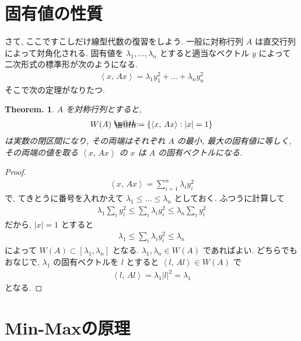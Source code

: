 \documentclass[openany, a4paper, oneside]{book}
\makeatletter
\newcommand*{\defeq}{\mathrel{\rlap{%
\raisebox{0.3ex}{$\m@th\cdot$}}%
\raisebox{-0.3ex}{$\m@th\cdot$}}%
=}
\theoremstyle{break}
\newtheorem{thm}{Theorem.}[section]
\theoremstyle{breakdefn}
\newcommand{\abs}[1]{\left|#1\right|}
\newcommand{\bkt}[2]{\left\langle#1,\,#2\right\rangle}
\newcommand{\set}[2]{\left\{#1 : #2\right\}}
\makeatother
\begin{document}
\section{固有値の性質}
\label{sec-4-2-2}

さて, ここですこしだけ線型代数の復習をしよう.
一般に対称行列 $A$ は直交行列によって対角化される.
固有値を $\lambda_1, \dots, \lambda_n$ とすると適当なベクトル $y$ によって二次形式の標準形が次のようになる.
\begin{align}
 \bkt{x}{Ax}
 =
 \lambda_1 y_1^2 + \dots + \lambda_n y_n^2
\end{align}
そこで次の定理がなりたつ.
\begin{thm}
 $A$ を対称行列とすると,
 \begin{align}
  W(A)
  \defeq
  \set{\bkt{x}{Ax}}{|x| = 1}
 \end{align}
 は実数の閉区間になり, その両端はそれぞれ $A$ の最小, 最大の固有値に等しく,
 その両端の値を取る $\bkt{x}{Ax}$ の $x$ は $A$ の固有ベクトルになる.
\end{thm}
\begin{proof}
\begin{align}
 \bkt{x}{Ax}
 =
 \sum_{i=1}^n \lambda_i y_i^2
\end{align}
で, てきとうに番号を入れかえて $\lambda_1 \le \dots \le \lambda_n$ としておく.
ふつうに計算して
\begin{align}
 \lambda_1 \sum_i y_i^2
 \le
 \sum_i \lambda_i y_i^2
 \le
 \lambda_n \sum_i y_i^2
\end{align}
だから, $\abs{x}=1$ とすると
\begin{align}
 \lambda_1
 \le
 \sum_i \lambda_i y_i^2
 \le
 \lambda_n
\end{align}
によって $W(A) \subset [\lambda_1, \lambda_n]$
となる.
$\lambda_1, \lambda_n \in W(A)$ であればよい.
どちらでもおなじで, $\lambda_1$ の固有ベクトルを $l$ とすると $\bkt{l}{Al} \in W(A)$ で
\begin{align}
 \bkt{l}{Al}
 =
 \lambda_1 \abs{l}^2
 =
 \lambda_1
\end{align}
となる.
\end{proof}
\section{Min-Maxの原理}
\label{sec-4-2-3}
\end{document}
